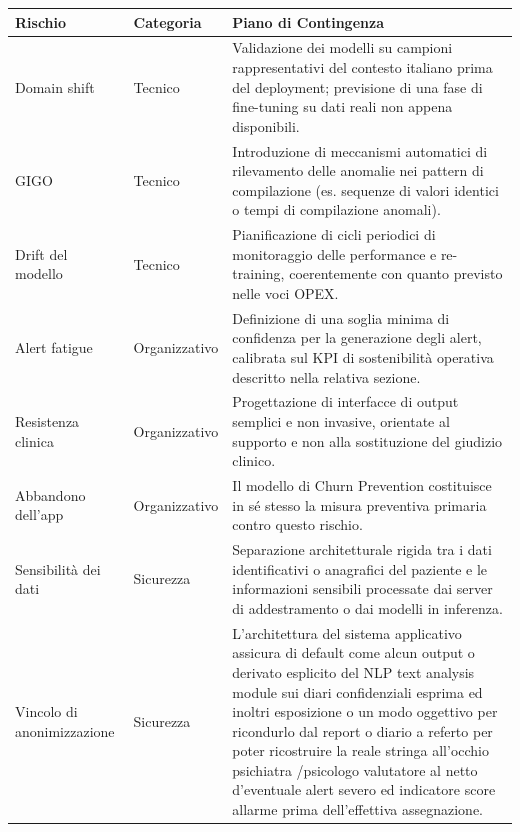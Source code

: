 \vspace{0.3cm}
\begin{table}[h]
\centering
\renewcommand{\arraystretch}{1.5}
\small
\begin{tabular}{|p{}|p{}|p{}|}
\hline
\textbf{Rischio} & \textbf{Categoria} & \textbf{Piano di Contingenza} \\
\hline
Domain shift & Tecnico & Validazione dei modelli su campioni rappresentativi del contesto italiano prima del deployment; previsione di una fase di fine-tuning su dati reali non appena disponibili. \\
\hline
GIGO & Tecnico & Introduzione di meccanismi automatici di rilevamento delle anomalie nei pattern di compilazione (es. sequenze di valori identici o tempi di compilazione anomali). \\
\hline
Drift del modello & Tecnico & Pianificazione di cicli periodici di monitoraggio delle performance e re-training, coerentemente con quanto previsto nelle voci OPEX. \\
\hline
Alert fatigue & Organizzativo & Definizione di una soglia minima di confidenza per la generazione degli alert, calibrata sul KPI di sostenibilità operativa descritto nella relativa sezione. \\
\hline
Resistenza clinica & Organizzativo & Progettazione di interfacce di output semplici e non invasive, orientate al supporto e non alla sostituzione del giudizio clinico. \\
\hline
Abbandono dell'app & Organizzativo & Il modello di Churn Prevention costituisce in sé stesso la misura preventiva primaria contro questo rischio. \\
\hline
Sensibilità dei dati & Sicurezza & Separazione architetturale rigida tra i dati identificativi o anagrafici del paziente e le informazioni sensibili processate dai server di addestramento o dai modelli in inferenza. \\
\hline
Vincolo di anonimizzazione & Sicurezza & L'architettura del sistema applicativo assicura di default come alcun output o derivato esplicito del NLP text analysis module sui diari confidenziali esprima ed inoltri esposizione o un modo oggettivo per ricondurlo dal report o diario a referto per poter ricostruire la reale stringa all'occhio psichiatra /psicologo valutatore al netto d'eventuale alert severo ed indicatore score allarme prima dell'effettiva assegnazione. \\
\hline
\end{tabular}
\end{table}
\clearpage
